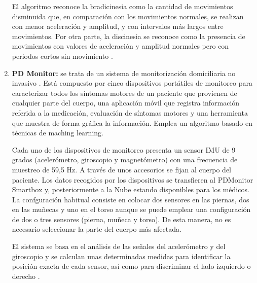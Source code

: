 \begin{enumerate}
    El algoritmo reconoce la bradicinesia como la cantidad de movimientos disminuida que, en comparación con los movimientos normales, se realizan con menor aceleración y amplitud, y con intervalos más largos entre movimientos. Por otra parte, la discinesia se reconoce como la presencia de movimientos con valores de aceleración y amplitud normales pero con periodos cortos sin movimiento
    \cite{griffiths2012automated, website:pkgcare,  santiago2019qualitative}.

    
    
    \item \textbf{PD Monitor:} se trata de un sistema de monitorización domiciliaria no invasivo . %
    Está compuesto por cinco dispositivos portátiles de monitoreo para caracterizar todos los síntomas motores de un paciente que provienen de cualquier parte del cuerpo, una aplicación móvil que registra información referida a la medicación, evaluación de síntomas motores y una herramienta que muestra de forma gráfica la información. Emplea un algoritmo basado en técnicas de maching learning. 

    Cada uno de los dispositivos de monitoreo presenta un sensor IMU de 9 grados (acelerómetro, giroscopio y magnetómetro) con una frecuencia de muestreo de 59,5 Hz. A través de unos accesorios se fijan al cuerpo del paciente. Los datos recogidos por los dispositivos se transfieren al PDMonitor Smartbox y, posteriormente a la Nube estando disponibles para los médicos.
    La confguración habitual consiste en colocar dos sensores en las piernas, dos en las muñecas y uno en el torso aunque se puede emplear una configuración de dos o tres sensores (pierna, muñeca y torso). De esta manera, no es necesario seleccionar la parte del cuerpo más afectada. 
    
    El sistema se basa en el análisis de las señales del acelerómetro y del giroscopio y se calculan unas determinadas medidas para identificar la posición exacta de cada sensor, así como para discriminar el lado izquierdo o derecho \cite{kostikis2020body}.



\end{enumerate}
